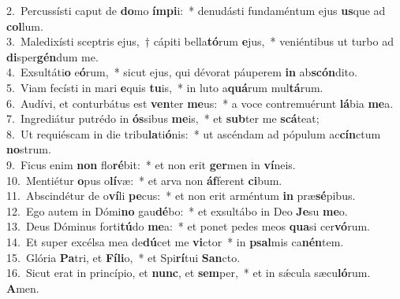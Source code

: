 {2.~}Percussísti caput de \textbf{do}mo \textbf{ím}\textbf{pi}i:~* denudásti fundaméntum ejus \textbf{us}que ad \textbf{col}lum.\\
{3.~}Maledixísti sceptris ejus,~† cápiti bella\textbf{tó}rum \textbf{e}jus,~* veniéntibus ut turbo ad \textbf{di}sper\textbf{gén}dum me.\\
{4.~}Exsultáti\textbf{o} e\textbf{ó}rum,~* sicut ejus, qui dévorat páuperem \textbf{in} ab\textbf{scón}dito.\\
{5.~}Viam fecísti in mari \textbf{e}quis \textbf{tu}is,~* in luto a\textbf{quá}rum mul\textbf{tá}rum.\\
{6.~}Audívi, et conturbátus est \textbf{ven}ter \textbf{me}us:~* a voce contremuérunt \textbf{lá}bia \textbf{me}a.\\
{7.~}Ingrediátur putrédo in \textbf{ós}sibus \textbf{me}is,~* et \textbf{sub}ter me \textbf{scá}teat;\\
{8.~}Ut requiéscam in die tribu\textbf{la}ti\textbf{ó}nis:~* ut ascéndam ad pópulum ac\textbf{cín}ctum \textbf{no}strum.\\
{9.~}Ficus enim \textbf{non} flo\textbf{ré}bit:~* et non erit \textbf{ger}men in \textbf{ví}neis.\\
{10.~}Mentiétur \textbf{o}pus o\textbf{lí}væ:~* et arva non \textbf{áf}ferent \textbf{ci}bum.\\
{11.~}Abscindétur de o\textbf{ví}li \textbf{pe}cus:~* et non erit arméntum \textbf{in} præ\textbf{sé}pibus.\\
{12.~}Ego autem in Dómi\textbf{no} gau\textbf{dé}bo:~* et exsultábo in Deo \textbf{Je}su \textbf{me}o.\\
{13.~}Deus Dóminus forti\textbf{tú}do \textbf{me}a:~* et ponet pedes meos \textbf{qua}si cer\textbf{vó}rum.\\
{14.~}Et super excélsa mea de\textbf{dú}cet me \textbf{vi}ctor~* in \textbf{psal}mis ca\textbf{nén}tem.\\
{15.~}Glória \textbf{Pa}tri, et \textbf{Fí}\textbf{li}o,~* et Spi\textbf{rí}tui \textbf{San}cto.\\
{16.~}Sicut erat in princípio, et \textbf{nunc}, et \textbf{sem}per,~* et in sǽcula sæcu\textbf{ló}rum. \textbf{A}men.\\
